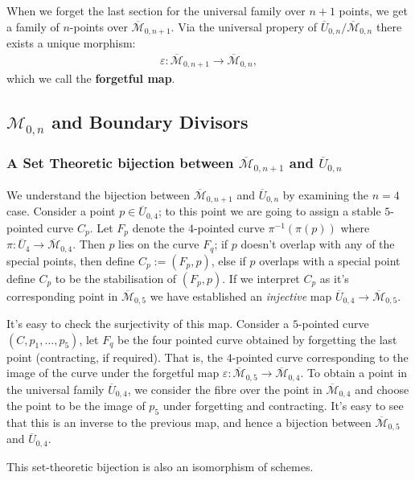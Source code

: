 When we forget the last section for the universal family over $n+1$ points, we get a family of $n$-points over $\overline{\mathcal{M}}_{0,n+1}$. 
Via the universal propery of $\overline{U}_{0,n}/\overline{\mathcal{M}}_{0,n}$ there exists a unique morphism:
\begin{align*}
    \varepsilon : \overline{\mathcal{M}}_{0,n+1} \to \overline{\mathcal{M}}_{0,n},
\end{align*}
which we call the \textbf{forgetful map}.
 
\subsection{$\mathcal{M}_{0,n}$ and Boundary Divisors}

\subsubsection{A Set Theoretic bijection between $\overline{\mathcal{M}}_{0,n+1}$ and $\overline{U}_{0,n}$}
We understand the bijection between $\overline{\mathcal{M}}_{0,n+1}$ and $\overline{U}_{0,n}$ by examining the $n=4$ case.
Consider a point $p \in \overline{U}_{0,4}$; to this point we are going to assign a stable $5$-pointed curve $C_{p}$.
Let $F_{p}$ denote the $4$-pointed curve $\pi^{-1}(\pi(p))$ where $\pi: \overline{U}_{4} \to \overline{\mathcal{M}}_{0,4}$.
Then $p$ lies on the curve $F_{q}$; if $p$ doesn't overlap with any of the special points, then define $C_{p} := (F_{p},p)$, else if $p$ overlaps with a special point define $C_{p}$ to be the stabilisation of $(F_{p},p)$.
If we interpret $C_{p}$ as it's corresponding point in $\overline{\mathcal{M}}_{0,5}$ we have established an \textit{injective} map $\overline{U}_{0,4} \to \overline{\mathcal{M}}_{0,5}$.
\par It's easy to check the surjectivity of this map.
Consider a $5$-pointed curve $(C,p_{1},\allowbreak\dots,\allowbreak p_{5})$, let $F_{q}$ be the four pointed curve obtained by forgetting the last point (contracting, if required).
That is, the $4$-pointed curve corresponding to the image of the curve under the forgetful map $\varepsilon : \overline{\mathcal{M}}_{0,5}\to \overline{\mathcal{M}}_{0,4}$.
To obtain a point in the universal family $\overline{U}_{0,4}$, we consider the fibre over the point in $\overline{\mathcal{M}}_{0,4}$ and choose the point to be the image of $p_{5}$ under forgetting and contracting. 
It's easy to see that this is an inverse to the previous map, and hence a bijection between $\overline{\mathcal{M}}_{0,5}$ and $\overline{U}_{0,4}$.
\par This set-theoretic bijection is also an isomorphism of schemes.

